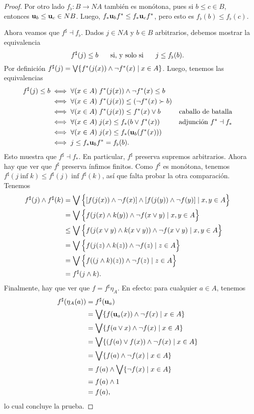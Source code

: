 \begin{proof}
  Por otro lado $f_\flat:B\to NA$ también es monótona,
  pues si $b\leq c\in B$, entonces $\mathbf u_{b}\leq\mathbf u_{c} \in NB$.
  Luego, $f_*\mathbf u_{b}f^*\leq f_*\mathbf u_{c}f^*$, pero
  esto es $f_\flat(b)\leq f_\flat(c)$.

  Ahora veamos que $f^\sharp \dashv f_\flat$.
  Dados $j\in NA$ y $b\in B$ arbitrarios, debemos mostrar la
  equivalencia
  \[
    f^\sharp(j)\leq b \hspace{5mm}\text{ si, y solo si }\hspace{5mm} j\leq f_\flat(b)
  .\]
  Por definición
  $f^\sharp(j)=\bigvee\{f^*(j(x))\wedge\neg f^*(x) \mid x\in A\}$.
  Luego, tenemos las equivalencias
  \begin{align*}
    f^\sharp(j) \leq b
    &\iff \forall(x\in A)\;f^*(j(x))\wedge\neg f^*(x)\leq b \\
    &\iff \forall(x\in A)\;f^*(j(x))\leq (\neg f^*(x)\succ b) \\
    &\iff \forall(x\in A)\;f^*(j(x)) \leq f^*(x)\vee b
      & \text{caballo de batalla} \\
    &\iff \forall(x\in A)\;j(x) \leq f_*(b\vee f^*(x))
      & \text{adjunción } f^*\dashv f_* \\
    &\iff \forall(x\in A)\;j(x) \leq f_*(\mathbf u_{b}(f^*(x))) \\
    &\iff j\leq f_*\mathbf u_{b} f^* = f_\flat(b).
  \end{align*}
  Esto muestra que $f^\sharp\dashv f_*$.
  En particular, $f^\sharp$ preserva supremos arbitrarios.
  Ahora hay que ver que $f^\sharp$ preserva ínfimos finitos.
  Como $f^\sharp$ es monótona, tenemos
  $f^\sharp(j\inf k)\leq f^\sharp(j)\inf f^\sharp(k)$,
  así que falta probar la otra comparación.
  Tenemos
  \begin{align*}
    f^\sharp(j)\wedge f^\sharp(k)
    &= \bigvee\Big\{[f(j(x))\wedge\neg f(x)]
        \wedge[f(j(y))\wedge\neg f(y)] \mid x,y\in A\Big\} \\
    &= \bigvee\Big\{f(j(x)\wedge k(y))\wedge\neg f(x\vee y)
        \mid x,y\in A\Big\} \\
    &\leq \bigvee\Big\{f(j(x\vee y)\wedge k(x\vee y))
        \wedge\neg f(x\vee y) \mid x,y\in A\Big\} \\
    &= \bigvee\Big\{f(j(z)\wedge k(z))
        \wedge\neg f(z) \mid z\in A\Big\} \\
    &= \bigvee\Big\{f((j\wedge k)(z))
        \wedge\neg f(z) \mid z\in A\Big\} \\
    &= f^\sharp(j\wedge k).
  \end{align*}
  Finalmente, hay que ver que $f=f^\sharp \eta_A$.
  En efecto: para cualquier $a\in A$, tenemos
  \begin{align*}
    f^\sharp(\eta_A(a))
    &= f^\sharp(\mathbf u_{a}) \\
    &= \bigvee\{f(\mathbf u_{a}(x))\wedge\neg f(x)\mid x\in A\} \\
    &= \bigvee\{f(a\vee x)\wedge\neg f(x)\mid x\in A\} \\
    &= \bigvee\{(f(a)\vee f(x))\wedge\neg f(x)\mid x\in A\} \\
    &= \bigvee\{f(a)\wedge\neg f(x)\mid x\in A\} \\
    &= f(a)\wedge\bigvee\{\neg f(x)\mid x\in A\} \\
    &= f(a)\wedge 1 \\
    &= f(a),
  \end{align*}
  lo cual concluye la prueba.
\end{proof}

